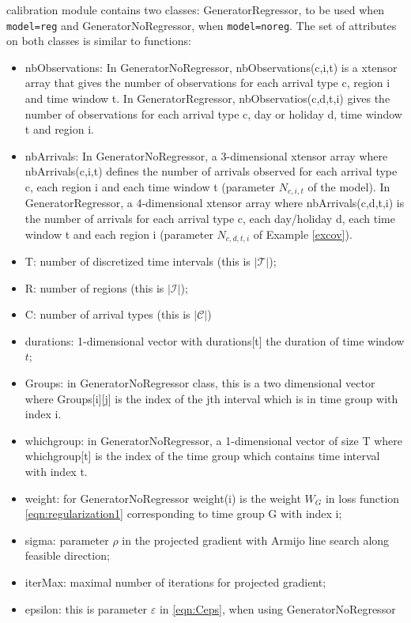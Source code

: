 \documentclass[article]{jss}
\begin{document}
{ calibration module contains two classes: GeneratorRegressor, to be used when {\tt{model=reg}} and GeneratorNoRegressor, when {\tt{model=noreg}}. The set of attributes on both classes is similar to  functions:
\begin{itemize}
    \item nbObservations: In GeneratorNoRegressor, nbObservations(c,i,t) is a xtensor array that gives the number of observations for each arrival type c, region i and time window t. In GeneratorRegressor, nbObservatios(c,d,t,i) gives the number of observations for each arrival type c, day or holiday d, time window t and region i.
    \item nbArrivals: In GeneratorNoRegressor, a 3-dimensional xtensor array where nbArrivals(c,i,t) defines the number of arrivals observed for each arrival type c, each region i and each time window t (parameter \(N_{c,i,t}\) of the model). In GeneratorRegressor, a 4-dimensional xtensor array where nbArrivals(c,d,t,i) is the number of arrivals for each arrival type c, each day/holiday d, each time window t and each region i (parameter \(N_{c,d,t,i}\) of Example \ref{excov}).
    \item T: number of discretized time intervals (this is $|\mathcal{T}|$);
    \item R: number of regions (this is $|\mathcal{I}|$);
    \item C: number of arrival types (this is $|\mathcal{C}|$)
    \item durations: 1-dimensional vector with durations[t] the duration of time window $t$;
    \item Groups: in GeneratorNoRegressor class, this is a two dimensional vector where Groups[i][j] is the index of the jth interval which is in time group with index i. 
    \item whichgroup: in GeneratorNoRegressor, a 1-dimensional vector of size T where whichgroup[t] is the index of the time group which contains time interval with index t. 
    \item weight: for GeneratorNoRegressor
    weight(i) is the weight $W_G$ in loss function \eqref{eqn:regularization1} corresponding to time group G with index i;
    \item sigma: parameter \(\rho\) in the projected gradient with Armijo line search along feasible direction;
    \item iterMax: maximal number of iterations for projected gradient;
    \item epsilon:  this is parameter $\varepsilon$ in \eqref{eqn:Ceps}, when using GeneratorNoRegressor

\end{itemize}}
\end{document}
